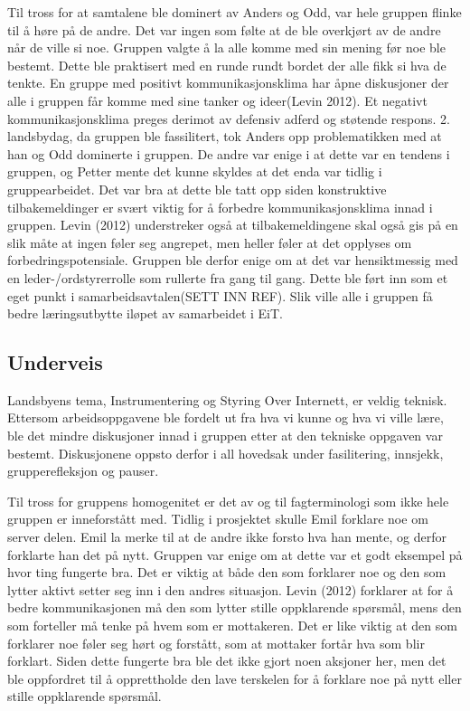 Til tross for at samtalene ble dominert av Anders og Odd, var hele gruppen flinke til å høre på de andre. 
Det var ingen som følte at de ble overkjørt av de andre når de ville si noe. 
Gruppen valgte å la alle komme med sin mening før noe ble bestemt. 
Dette ble praktisert med en runde rundt bordet der alle fikk si hva de tenkte. 
En gruppe med positivt kommunikasjonsklima har åpne diskusjoner der alle i gruppen får komme med sine tanker og ideer(Levin 2012). 
Et negativt kommunikasjonsklima preges derimot av defensiv adferd og støtende respons. 
2. landsbydag, da gruppen ble fassilitert, tok Anders opp problematikken med at han og Odd dominerte i gruppen. 
De andre var enige i at dette var en tendens i gruppen, og Petter mente det kunne skyldes at det enda var tidlig i gruppearbeidet. 
Det var bra at dette ble tatt opp siden konstruktive tilbakemeldinger er svært viktig for å forbedre kommunikasjonsklima innad i gruppen.
Levin (2012) understreker også at tilbakemeldingene skal også gis på en slik måte at ingen føler seg angrepet, men heller føler at det opplyses om forbedringspotensiale.
Gruppen ble derfor enige om at det var hensiktmessig med en leder-/ordstyrerrolle som rullerte fra gang til gang.
Dette ble ført inn som et eget punkt i samarbeidsavtalen(SETT INN REF). %
Slik ville alle i gruppen få bedre læringsutbytte iløpet av samarbeidet i EiT. 
\vspace{\secspace}

\subsection{Underveis}
Landsbyens tema, Instrumentering og Styring Over Internett, er veldig teknisk. 
Ettersom arbeidsoppgavene ble fordelt ut fra hva vi kunne og hva vi ville lære, ble det mindre diskusjoner innad i gruppen etter at den tekniske oppgaven var bestemt. 
Diskusjonene oppsto derfor i all hovedsak under fasilitering, innsjekk, grupperefleksjon og pauser. 
\vspace{\secspace}

Til tross for gruppens homogenitet er det av og til fagterminologi som ikke hele gruppen er inneforstått med.  
Tidlig i prosjektet skulle Emil forklare noe om server delen. 
Emil la merke til at de andre ikke forsto hva han mente, og derfor forklarte han det på nytt. 
Gruppen var enige om at dette var et godt eksempel på hvor ting fungerte bra. 
Det er viktig at både den som forklarer noe og den som lytter aktivt setter seg inn i den andres situasjon.
Levin (2012) forklarer at for å bedre kommunikasjonen må den som lytter stille oppklarende spørsmål, mens den som forteller må tenke på hvem som er mottakeren. 
Det er like viktig at den som forklarer noe føler seg hørt og forstått, som at mottaker fortår hva som blir forklart. 
Siden dette fungerte bra ble det ikke gjort noen aksjoner her, men det ble oppfordret til å opprettholde den lave terskelen for å forklare noe på nytt eller stille oppklarende spørsmål.
\vspace{\secspace}

